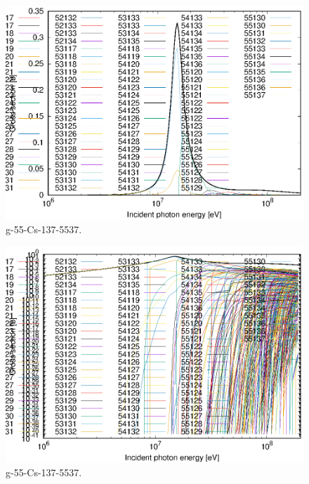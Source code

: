 \begin{figure}
 \includegraphics[width=\linewidth]{eps/g_55-Cs-137_5537.eps}
  \caption{g-55-Cs-137-5537.}
\end{figure}
\begin{figure}
 \includegraphics[width=\linewidth]{eps-log/g_55-Cs-137_5537.eps}
 \caption{g-55-Cs-137-5537.}
\end{figure}
\newpage \clearpage

